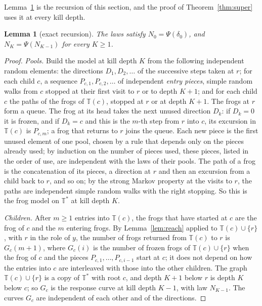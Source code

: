 \documentclass[11pt]{amsart}
\newtheorem{lemma}[theorem]{Lemma}
\theoremstyle{definition}
\numberwithin{equation}{section}
\newcommand{\lean}[1]{\ignorespaces}
\newcommand{\T}{\mathbb{T}}
\newcommand{\Ts}{\mathbb{T}^{*}}
\begin{document}
Lemma~\ref{lem:recursion} is the recursion of this section, and the proof of Theorem~\ref{thm:super} uses it at every kill depth.

\begin{lemma}[exact recursion]\label{lem:recursion}\lean{FrogModel.Recursion.curveLawSucc_holds, FrogModel.Recursion.curveLawZero_holds, FrogModel.Recursion.CurveLawSucc, FrogModel.Recursion.CurveLawZero, FrogModel.Recursion.curveLaw, FrogModel.Recursion.psiLaw, FrogModel.Pool.mapPoolSeq_holds, FrogModel.Pool.mapPoolRead_holds}
The laws satisfy $N_0=\Psi(\delta_0)$, and $N_K=\Psi(N_{K-1})$ for every $K\ge1$.
\end{lemma}

\begin{proof}
\emph{Pools.} Build the model at kill depth $K$ from the following independent random elements: the directions $D_1,D_2,\dots$ of the successive steps taken at $r$; for each child $c$, a sequence $P_{c,1},P_{c,2},\dots$ of independent \emph{entry pieces}, simple random walks from $c$ stopped at their first visit to $r$ or to depth $K+1$; and for each child $c$ the paths of the frogs of $\T(c)$, stopped at $r$ or at depth $K+1$. The frogs at $r$ form a queue. The frog at its head takes the next unused direction $D_k$: if $D_k=0$ it is frozen, and if $D_k=c$ and this is the $m$-th step from $r$ into $c$, its excursion in $\T(c)$ is $P_{c,m}$; a frog that returns to $r$ joins the queue. Each new piece is the first unused element of one pool, chosen by a rule that depends only on the pieces already used; by induction on the number of pieces used, these pieces, listed in the order of use, are independent with the laws of their pools. The path of a frog is the concatenation of its pieces, a direction at $r$ and then an excursion from a child back to $r$, and so on; by the strong Markov property at the visits to $r$, the paths are independent simple random walks with the right stopping. So this is the frog model on $\Ts$ at kill depth $K$.

\emph{Children.} After $m\ge1$ entries into $\T(c)$, the frogs that have started at $c$ are the frog of $c$ and the $m$ entering frogs. By Lemma~\ref{lem:reach} applied to $\T(c)\cup\{r\}$, with $r$ in the role of $y$, the number of frogs returned from $\T(c)$ to $r$ is $G_c(m+1)$, where $G_c(i)$ is the number of frozen frogs of $\T(c)\cup\{r\}$ when the frog of $c$ and the pieces $P_{c,1},\dots,P_{c,i-1}$ start at $c$; it does not depend on how the entries into $c$ are interleaved with those into the other children. The graph $\T(c)\cup\{r\}$ is a copy of $\Ts$ with root $c$, and depth $K+1$ below $r$ is depth $K$ below $c$; so $G_c$ is the response curve at kill depth $K-1$, with law $N_{K-1}$. The curves $G_c$ are independent of each other and of the directions.


\end{proof}
\end{document}
